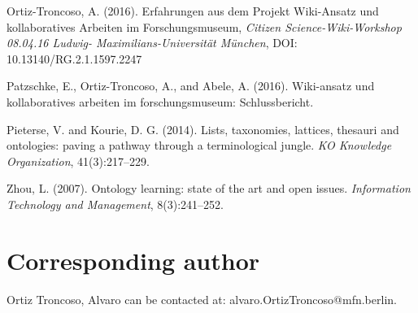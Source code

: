 \documentclass{ijcs_template}
\begin{document}
\begin{thebibliography}
Ortiz-Troncoso, A. (2016). Erfahrungen aus dem Projekt Wiki-Ansatz und kollaboratives Arbeiten im Forschungsmuseum,
{\it Citizen Science-Wiki-Workshop 08.04.16 Ludwig- Maximilians-Universit\"at München}, DOI: 10.13140/RG.2.1.1597.2247

Patzschke, E., Ortiz-Troncoso, A., and Abele, A. (2016). Wiki-ansatz und kollaboratives arbeiten im
forschungsmuseum: Schlussbericht.

Pieterse, V. and Kourie, D. G. (2014). Lists, taxonomies, lattices, thesauri and ontologies: paving a
pathway through a terminological jungle. {\it KO Knowledge Organization}, 41(3):217–229.

Zhou, L. (2007). Ontology learning: state of the art and open issues. {\it Information Technology and
Management}, 8(3):241–252.

\end{thebibliography}

\section*{Corresponding author}
Ortiz Troncoso, Alvaro can be contacted at: alvaro.OrtizTroncoso@mfn.berlin.
\end{document}
